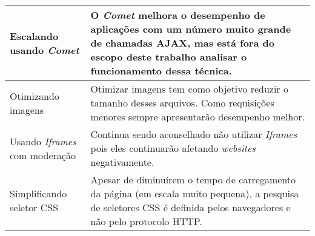 \begin{tabularx}{\textwidth}{| X | X |}
	Escalando usando \textit{Comet} & O \textit{Comet} melhora o desempenho de aplicações com um número muito grande de chamadas AJAX, mas está fora do escopo deste trabalho analisar o funcionamento dessa técnica. \\
	\hline
	Otimizando imagens & Otimizar imagens tem como objetivo reduzir o tamanho desses arquivos. Como requisições menores sempre apresentarão desempenho melhor. \\
	\hline
	Usando \textit{Iframes} com moderação & Continua sendo aconselhado não utilizar \textit{Iframes} pois eles continuarão afetando \textit{websites} negativamente. \\
	\hline
	Simplificando seletor CSS & Apesar de diminuírem o tempo de carregamento da página (em escala muito pequena), a pesquisa de seletores CSS é definida pelos navegadores e não pelo protocolo HTTP. \\
	\hline
\end{tabularx}